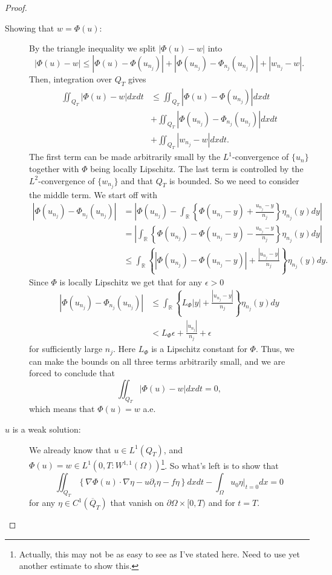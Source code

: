 \documentclass[11pt, a4paper]{article}
\begin{document}
\begin{proof}
\begin{description}
	\item[Showing that $w=\Phi(u)$:] By the triangle inequality we split $|\Phi(u)-w|$ into
	\begin{equation*}
	|\Phi(u) - w| \leq |\Phi(u) - \Phi(u_{n_j})| + |\Phi(u_{n_j}) - \Phi_{n_j}(u_{n_j})| + |w_{n_j}-w|. 
	\end{equation*}
	Then, integration over $Q_T$ gives
	\begin{align*}
	\iint_{Q_T}|\Phi(u)-w|dxdt &\leq \iint_{Q_T}|\Phi(u)-\Phi(u_{n_j})|dxdt \\
	&+ \iint_{Q_T}|\Phi(u_{n_j})-\Phi_{n_j}(u_{n_j})|dxdt \\
	&+ \iint_{Q_T}|w_{n_j} - w|dxdt.
	\end{align*}
	The first term can be made arbitrarily small by the $L^1$-convergence of $\{u_n\}$ together with $\Phi$ being locally Lipschitz. The last term is controlled by the $L^2$-convergence of $\{w_{n_j}\}$ and that $Q_T$ is bounded. So we need to consider the middle term. We start off with
	\begin{align*}
	|\Phi(u_{n_j}) - \Phi_{n_j}(u_{n_j})| &= \left| \Phi(u_{n_j}) - \int_{\mathbb{R}}\left\{ \Phi(u_{n_j}-y) + \frac{u_{n_j}-y}{n_j} \right\} \eta_{n_j}(y)dy  \right| \\
	&= \left|\int_\mathbb{R}\left\{\Phi(u_{n_j})-\Phi(u_{n_j}-y)-\frac{u_{n_j}-y}{n_j} \right\} \eta_{n_j}(y)dy \right| \\
	&\leq \int_\mathbb{R}\left\{ |\Phi(u_{n_j})-\Phi(u_{n_j}-y)|+\frac{|u_{n_j}-y|}{n_j}\right\} \eta_{n_j}(y)dy.
	\end{align*}
	Since $\Phi$ is locally Lipschitz we get that for any $\epsilon >0$
	\begin{align*}
	|\Phi(u_{n_j}) - \Phi_{n_j}(u_{n_j})| &\leq \int_\mathbb{R}\left\{ L_{\Phi}|y|+\frac{|u_{n_j}-y|}{n_j}\right\} \eta_{n_j}(y)dy \\
	&< L_{\Phi}\epsilon + \frac{|u_{n_j}|}{n_j}+\epsilon
	\end{align*}
	for sufficiently large $n_j$. Here $L_\Phi$ is a Lipschitz constant for $\Phi$. Thus, we can make the bounds on all three terms arbitrarily small, and we are forced to conclude that 
	\begin{equation}
	\iint_{Q_T}|\Phi(u)-w|dxdt = 0,
	\end{equation}	 
	which means that $\Phi(u) = w$ a.e.
	
	\item[$u$ is a weak solution:] We already know that $u \in L^1(Q_T)$, and $\Phi(u)=w \in L^1(0,T: W^{1,1}(\Omega))$\footnote{Actually, this may not be as easy to see as I've stated here. Need to use yet another estimate to show this.}. So what's left is to show that
	\begin{equation*}
	\iint_{Q_T}\left\{ \nabla\Phi(u) \cdot \nabla \eta - u\partial_t \eta - f\eta \right\}dxdt - \int_\Omega u_0\eta\big|_{t=0}dx = 0
	\end{equation*}
	for any $\eta \in C^1(\overline{Q}_T)$ that vanish on $\partial \Omega \times [0,T)$ and for $t=T$.
\end{description}


\end{proof}
\end{document}
